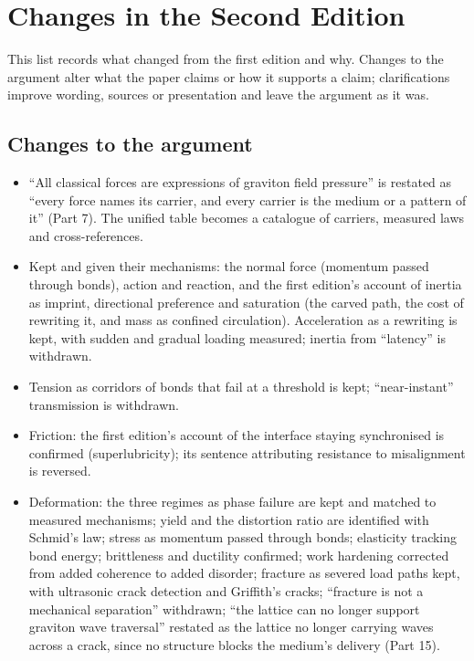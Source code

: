 \clearpage
\section*{Changes in the Second Edition}

This list records what changed from the first edition and why. Changes to the argument alter what the paper claims or how it supports a claim; clarifications improve wording, sources or presentation and leave the argument as it was.

\subsection*{Changes to the argument}
\begin{itemize}
\item ``All classical forces are expressions of graviton field pressure'' is restated as ``every force names its carrier, and every carrier is the medium or a pattern of it'' (Part 7). The unified table becomes a catalogue of carriers, measured laws and cross-references.
\item Kept and given their mechanisms: the normal force (momentum passed through bonds), action and reaction, and the first edition's account of inertia as imprint, directional preference and saturation (the carved path, the cost of rewriting it, and mass as confined circulation). Acceleration as a rewriting is kept, with sudden and gradual loading measured; inertia from ``latency'' is withdrawn.
\item Tension as corridors of bonds that fail at a threshold is kept; ``near-instant'' transmission is withdrawn.
\item Friction: the first edition's account of the interface staying synchronised is confirmed (superlubricity); its sentence attributing resistance to misalignment is reversed.
\item Deformation: the three regimes as phase failure are kept and matched to measured mechanisms; yield and the distortion ratio are identified with Schmid's law; stress as momentum passed through bonds; elasticity tracking bond energy; brittleness and ductility confirmed; work hardening corrected from added coherence to added disorder; fracture as severed load paths kept, with ultrasonic crack detection and Griffith's cracks; ``fracture is not a mechanical separation'' withdrawn; ``the lattice can no longer support graviton wave traversal'' restated as the lattice no longer carrying waves across a crack, since no structure blocks the medium's delivery (Part 15).

\end{itemize}
